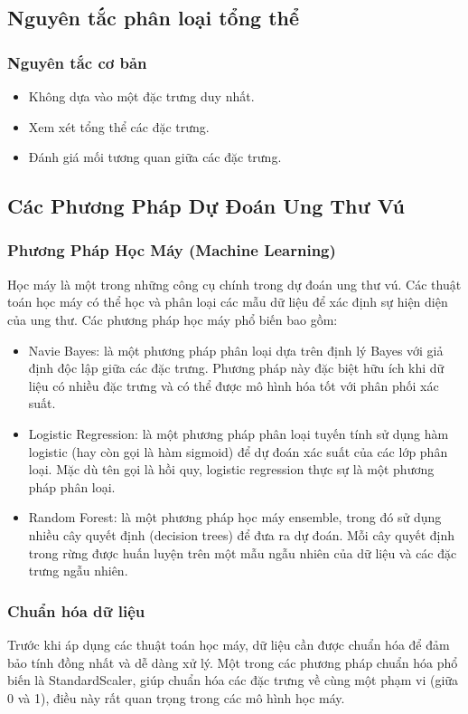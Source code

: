 \subsection{Nguyên tắc phân loại tổng thể}
\subsubsection{Nguyên tắc cơ bản}
\begin{itemize}
    \item Không dựa vào một đặc trưng duy nhất.
    \item Xem xét tổng thể các đặc trưng.
    \item Đánh giá mối tương quan giữa các đặc trưng.
\end{itemize}
\subsection{Các Phương Pháp Dự Đoán Ung Thư Vú}
\subsubsection{Phương Pháp Học Máy (Machine Learning)}
Học máy là một trong những công cụ chính trong dự đoán ung thư vú. Các thuật toán học máy có thể học và phân loại các mẫu dữ liệu để xác định sự hiện diện của ung thư. Các phương pháp học máy phổ biến bao gồm:
\begin{itemize}
    \item {Navie Bayes:} là một phương pháp phân loại dựa trên định lý Bayes với giả định độc lập giữa các đặc trưng. Phương pháp này đặc biệt hữu ích khi dữ liệu có nhiều đặc trưng và có thể được mô hình hóa tốt với phân phối xác suất.
    \item {Logistic Regression:} là một phương pháp phân loại tuyến tính sử dụng hàm logistic (hay còn gọi là hàm sigmoid) để dự đoán xác suất của các lớp phân loại. Mặc dù tên gọi là hồi quy, logistic regression thực sự là một phương pháp phân loại.
    \item {Random Forest:} là một phương pháp học máy ensemble, trong đó sử dụng nhiều cây quyết định (decision trees) để đưa ra dự đoán. Mỗi cây quyết định trong rừng được huấn luyện trên một mẫu ngẫu nhiên của dữ liệu và các đặc trưng ngẫu nhiên.
\end{itemize}
\subsubsection{Chuẩn hóa dữ liệu}
Trước khi áp dụng các thuật toán học máy, dữ liệu cần được chuẩn hóa để đảm bảo tính đồng nhất và dễ dàng xử lý. Một trong các phương pháp chuẩn hóa phổ biến là StandardScaler, giúp chuẩn hóa các đặc trưng về cùng một phạm vi (giữa 0 và 1), điều này rất quan trọng trong các mô hình học máy.
